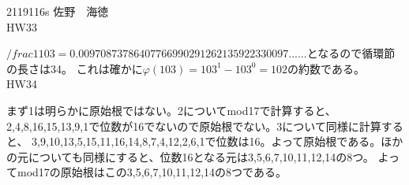\documentclass[11pt]{article}
\begin{document}
2119116s 佐野　海徳\\
HW33
\par $/frac{1}{103} = 0.00970873786407766990291262135922330097......$となるので循環節の長さは34。
これは確かに$\varphi(103) = 103^1 - 103^0 = 102$の約数である。\\
HW34
\par まず1は明らかに原始根ではない。2についてmod17で計算すると、2,4,8,16,15,13,9,1で位数が16でないので原始根でない。3について同様に計算すると、
3,9,10,13,5,15,11,16,14,8,7,4,12,2,6,1で位数は16。よって原始根である。ほかの元についても同様にすると、位数16となる元は3,5,6,7,10,11,12,14の8つ。
よってmod17の原始根はこの3,5,6,7,10,11,12,14の8つである。
\end{document}
